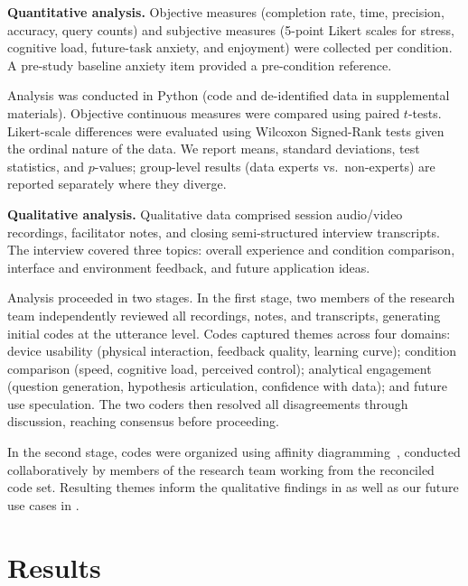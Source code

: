\documentclass[12pt]{cmuthesis}
\begin{document}
\textbf{Quantitative analysis.} Objective measures (completion rate, time, precision, accuracy, query counts) and subjective measures (5-point Likert scales for stress, cognitive load, future-task anxiety, and enjoyment) were collected per condition. A pre-study baseline anxiety item provided a pre-condition reference.

Analysis was conducted in Python (code and de-identified data in supplemental materials). Objective continuous measures were compared using paired $t$-tests. Likert-scale differences were evaluated using Wilcoxon Signed-Rank tests given the ordinal nature of the data. We report means, standard deviations, test statistics, and $p$-values; group-level results (data experts vs.\ non-experts) are reported separately where they diverge.

\textbf{Qualitative analysis.} Qualitative data comprised session audio/video recordings, facilitator notes, and closing semi-structured interview transcripts. The interview covered three topics: overall experience and condition comparison, interface and environment feedback, and future application ideas.

Analysis proceeded in two stages. In the first stage, two members of the research team independently reviewed all recordings, notes, and transcripts, generating initial codes at the utterance level. Codes captured themes across four domains: device usability (physical interaction, feedback quality, learning curve); condition comparison (speed, cognitive load, perceived control); analytical engagement (question generation, hypothesis articulation, confidence with data); and future use speculation. The two coders then resolved all disagreements through discussion, reaching consensus before proceeding.

In the second stage, codes were organized using affinity diagramming~\cite{Harboe2015}, conducted collaboratively by members of the research team working from the reconciled code set. Resulting themes inform the qualitative findings in  as well as our future use cases in .

\section{Results}
\label{sec:results}
\end{document}
